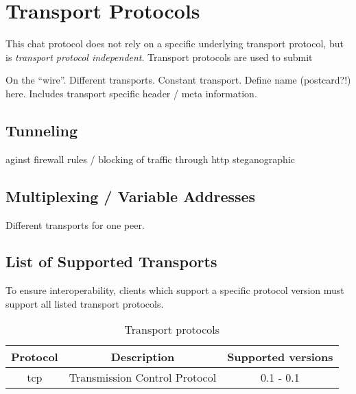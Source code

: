 \section{Transport Protocols}
This chat protocol does not rely on a specific underlying transport protocol,
but is \textit{transport protocol independent}. Transport protocols are used
to submit 


On the "`wire"'. Different transports. Constant transport.
Define name (postcard?!) here. Includes transport specific
header / meta information.

\subsection{Tunneling}
aginst firewall rules / blocking of traffic
through http
steganographic

\subsection{Multiplexing / Variable Addresses}
Different transports for one peer.

\subsection{List of Supported Transports}
To ensure interoperability, clients which support a specific
protocol version must support all listed transport protocols.
\begin{longtable}{|c|c|c|}
\caption{Transport protocols}\\
\hline
\textbf{Protocol} & \textbf{Description} & \textbf{Supported versions}\\
\hline
tcp & Transmission Control Protocol & 0.1 - 0.1\\
\hline
\end{longtable}


